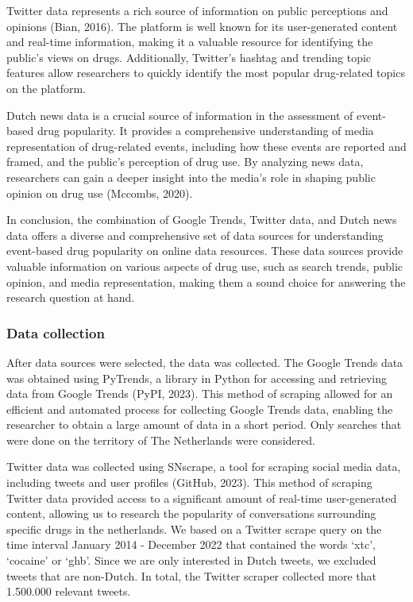 Twitter data represents a rich source of information on public perceptions and opinions (Bian, 2016). The platform is well known for its user-generated content and real-time information, making it a valuable resource for identifying the public's views on drugs. Additionally, Twitter's hashtag and trending topic features allow researchers to quickly identify the most popular drug-related topics on the platform.

Dutch news data is a crucial source of information in the assessment of event-based drug popularity. It provides a comprehensive understanding of media representation of drug-related events, including how these events are reported and framed, and the public's perception of drug use. By analyzing news data, researchers can gain a deeper insight into the media's role in shaping public opinion on drug use (Mccombs, 2020).

In conclusion, the combination of Google Trends, Twitter data, and Dutch news data offers a diverse and comprehensive set of data sources for understanding event-based drug popularity on online data resources. These data sources provide valuable information on various aspects of drug use, such as search trends, public opinion, and media representation, making them a sound choice for answering the research question at hand.

\subsubsection{Data collection}

After data sources were selected, the data  was collected. The Google Trends data was obtained using PyTrends, a library in Python for accessing and retrieving data from Google Trends (PyPI, 2023). This method of scraping allowed for an efficient and automated process for collecting Google Trends data, enabling the researcher to obtain a large amount of data in a short period. Only searches that were done on the territory of The Netherlands were considered.

Twitter data was collected using SNscrape, a tool for scraping social media data, including tweets and user profiles (GitHub, 2023). This method of scraping Twitter data provided access to a significant amount of real-time user-generated content, allowing us to research the popularity of conversations surrounding specific drugs in the netherlands. We based on a Twitter scrape query on the time interval January 2014 - December 2022 that contained the words ‘xtc’, ‘cocaine’ or ‘ghb’. Since we are only interested in Dutch tweets, we excluded tweets that are non-Dutch. In total, the Twitter scraper collected more that 1.500.000 relevant tweets.

